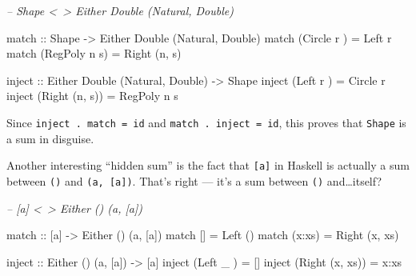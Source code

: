 \documentclass[]{article}
\newenvironment{Shaded}{}{}
\newcommand{\CommentTok}[1]{\textcolor[rgb]{0.38,0.63,0.69}{\textit{#1}}}
\newcommand{\DataTypeTok}[1]{\textcolor[rgb]{0.56,0.13,0.00}{#1}}
\newcommand{\FunctionTok}[1]{\textcolor[rgb]{0.02,0.16,0.49}{#1}}
\newcommand{\NormalTok}[1]{#1}
\newcommand{\OtherTok}[1]{\textcolor[rgb]{0.00,0.44,0.13}{#1}}
\begin{document}
\begin{Shaded}
\begin{Highlighting}[]
\CommentTok{-- Shape <~> Either Double (Natural, Double)}

\OtherTok{match ::} \DataTypeTok{Shape} \OtherTok{->} \DataTypeTok{Either} \DataTypeTok{Double}\NormalTok{ (}\DataTypeTok{Natural}\NormalTok{, }\DataTypeTok{Double}\NormalTok{)}
\NormalTok{match (}\DataTypeTok{Circle}\NormalTok{  r  ) }\FunctionTok{=} \DataTypeTok{Left}\NormalTok{ r}
\NormalTok{match (}\DataTypeTok{RegPoly}\NormalTok{ n s) }\FunctionTok{=} \DataTypeTok{Right}\NormalTok{ (n, s)}

\OtherTok{inject ::} \DataTypeTok{Either} \DataTypeTok{Double}\NormalTok{ (}\DataTypeTok{Natural}\NormalTok{, }\DataTypeTok{Double}\NormalTok{) }\OtherTok{->} \DataTypeTok{Shape}
\NormalTok{inject (}\DataTypeTok{Left}\NormalTok{   r    ) }\FunctionTok{=} \DataTypeTok{Circle}\NormalTok{  r}
\NormalTok{inject (}\DataTypeTok{Right}\NormalTok{ (n, s)) }\FunctionTok{=} \DataTypeTok{RegPoly}\NormalTok{ n s}
\end{Highlighting}
\end{Shaded}

Since \texttt{inject\ .\ match\ =\ id} and \texttt{match\ .\ inject\ =\ id},
this proves that \texttt{Shape} is a sum in disguise.

Another interesting ``hidden sum'' is the fact that \texttt{{[}a{]}} in Haskell
is actually a sum between \texttt{()} and \texttt{(a,\ {[}a{]})}. That's right
--- it's a sum between \texttt{()} and\ldots{}itself?

\begin{Shaded}
\begin{Highlighting}[]
\CommentTok{-- [a] <~> Either () (a, [a])}

\OtherTok{match ::}\NormalTok{ [a] }\OtherTok{->} \DataTypeTok{Either}\NormalTok{ () (a, [a])}
\NormalTok{match []     }\FunctionTok{=} \DataTypeTok{Left}\NormalTok{  ()}
\NormalTok{match (x}\FunctionTok{:}\NormalTok{xs) }\FunctionTok{=} \DataTypeTok{Right}\NormalTok{ (x, xs)}

\OtherTok{inject ::} \DataTypeTok{Either}\NormalTok{ () (a, [a]) }\OtherTok{->}\NormalTok{ [a]}
\NormalTok{inject (}\DataTypeTok{Left}\NormalTok{   _     ) }\FunctionTok{=}\NormalTok{ []}
\NormalTok{inject (}\DataTypeTok{Right}\NormalTok{ (x, xs)) }\FunctionTok{=}\NormalTok{ x}\FunctionTok{:}\NormalTok{xs}
\end{Highlighting}
\end{Shaded}
\end{document}
